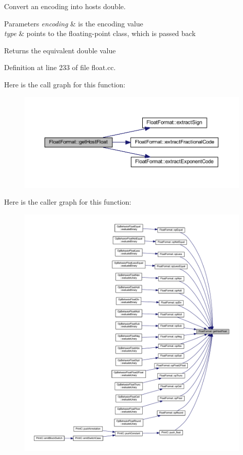 Convert an encoding into host\textquotesingle{}s double. 


\begin{DoxyParams}{Parameters}
{\em encoding} & is the encoding value \\
\hline
{\em type} & points to the floating-\/point class, which is passed back \\
\hline
\end{DoxyParams}
\begin{DoxyReturn}{Returns}
the equivalent double value 
\end{DoxyReturn}


Definition at line 233 of file float.\+cc.

Here is the call graph for this function\+:
\nopagebreak
\begin{figure}[H]
\begin{center}
\leavevmode
\includegraphics[width=350pt]{class_float_format_a5205f99f7973cde7ffe0054d07cf82bc_cgraph}
\end{center}
\end{figure}
Here is the caller graph for this function\+:
\nopagebreak
\begin{figure}[H]
\begin{center}
\leavevmode
\includegraphics[width=350pt]{class_float_format_a5205f99f7973cde7ffe0054d07cf82bc_icgraph}
\end{center}
\end{figure}
